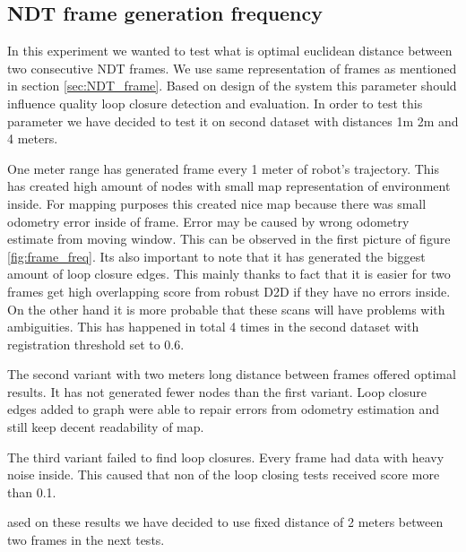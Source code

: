 \subsection{NDT frame generation frequency}
In this experiment we wanted to test what is optimal euclidean distance between two consecutive \gls{NDT} frames. We use same representation of frames as mentioned in section \ref{sec:NDT_frame}. Based on design of the system this parameter should influence quality loop closure detection and evaluation. In order to test this parameter we have decided to test it on second dataset with distances 1m 2m and 4 meters.

One meter range has generated frame every 1 meter of robot's trajectory. This has created high amount of nodes with small map representation of environment inside. For mapping purposes this created nice map because there was small odometry error inside of frame. Error may be caused by wrong odometry estimate from moving window. This can be observed in the first picture of figure \ref{fig:frame_freq}. Its also important to note that it has generated the biggest amount of loop closure edges. This mainly thanks to fact that it is easier for two frames get high overlapping score from robust D2D if they have no errors inside. On the other hand it is more probable that these scans will have problems with ambiguities. This has happened in total 4 times in the second dataset with registration threshold set to 0.6.

The second variant with two meters long distance between frames offered optimal results. It has not generated fewer nodes than the first variant. Loop closure edges added to graph were able to repair errors from odometry estimation and still keep decent readability of map.

The third variant failed to find loop closures. Every frame had data with heavy noise inside. This caused that non of the loop closing tests received score more than 0.1.

ased on these results we have decided to use fixed distance of 2 meters between two frames in the next tests.


